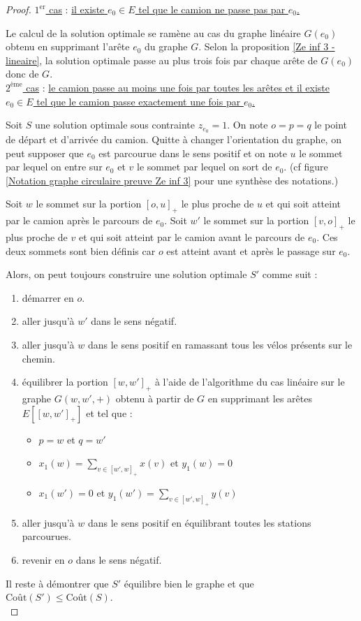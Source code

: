 \begin{proof}\uline{$1^{\mbox{er}}$ cas} : \uline{il existe $e_0 \in E$ tel que le camion ne passe pas par $e_0$.}

Le calcul de la solution optimale se ramène au cas du graphe linéaire $G(e_0)$ obtenu en supprimant l'arête $e_0$ du graphe $G$. Selon la proposition \ref{Ze inf 3 - lineaire}, la solution optimale passe au plus trois fois par chaque arête de $G(e_0)$ donc de $G$.
\\

\uline{$2^{\mbox{ème}}$ cas} : \uline{le camion passe au moins une fois par toutes les arêtes et il existe $e_0 \in E$ tel que le camion passe exactement une fois par $e_0$.}

Soit $S$ une solution optimale sous contrainte $z_{e_0} = 1$. On note $o=p=q$ le point de départ et d'arrivée du camion. Quitte à changer l'orientation du graphe, on peut supposer que $e_0$ est parcourue dans le sens positif et on note $u$ le sommet par lequel on entre sur $e_0$ et $v$ le sommet par lequel on sort de $e_0$. (cf figure \ref{Notation graphe circulaire preuve Ze inf 3} pour une synthèse des notations.)

Soit $w$ le sommet sur la portion $[o,u]_+$ le plus proche de $u$ et qui soit atteint par le camion après le parcours de $e_0$. Soit $w'$ le sommet sur la portion $[v,o]_+$ le plus proche de $v$ et qui soit atteint par le camion avant le parcours de $e_0$. Ces deux sommets sont bien définis car $o$ est atteint avant et après le passage sur $e_0$.

Alors, on peut toujours construire une solution optimale $S'$ comme suit :
\begin{enumerate}
\item\label{NewS1} démarrer en $o$.
\item\label{NewS2} aller jusqu'à $w'$ dans le sens négatif.
\item\label{NewS3} aller jusqu'à $w$ dans le sens positif en ramassant tous les vélos présents sur le chemin.
\item\label{NewS4} équilibrer la portion $[w,w']_+$ à l'aide de l'algorithme du cas linéaire sur le graphe $G(w,w',+)$ obtenu à partir de $G$ en supprimant les arêtes $E\left[\left[w,w'\right]_+\right]$ et tel que :
  \begin{itemize}
  \item $p=w$ et $q=w'$
  \item $x_1(w) = \sum_{v \in \left[w',w\right]_+} x(v)$ et $y_1(w) = 0$
  \item $x_1(w') = 0$ et $y_1(w') = \sum_{v \in \left[w',w\right]_+} y(v)$
  \end{itemize}
\item\label{NewS5} aller jusqu'à $w$ dans le sens positif en équilibrant toutes les stations parcourues.
\item\label{NewS6} revenir en $o$ dans le sens négatif.
\end{enumerate}
Il reste à démontrer que $S'$ équilibre bien le graphe et que $\mbox{Coût}(S') \le \mbox{Coût}(S)$.
\\


\end{proof}
